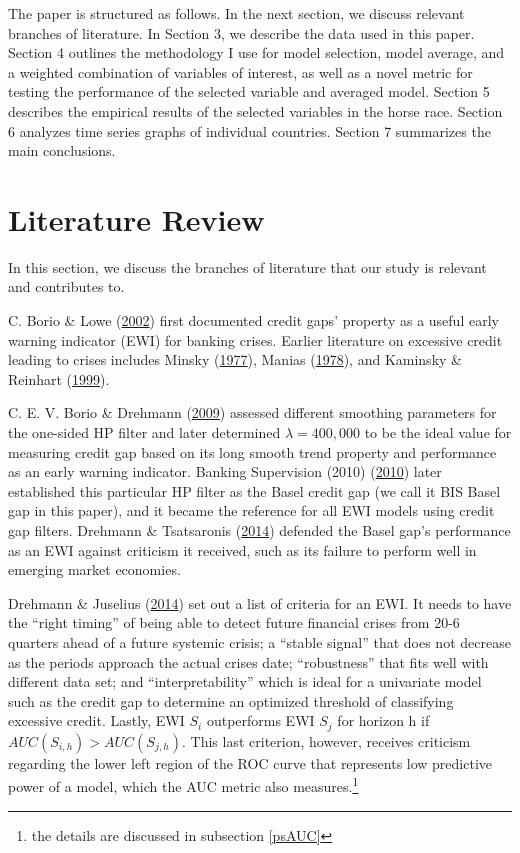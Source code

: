 \documentclass[
  12pt,
]{article}
\begin{document}
The paper is structured as follows. In the next section, we discuss relevant branches of literature. In Section 3, we describe the data used in this paper. Section 4 outlines the methodology I use for model selection, model average, and a weighted combination of variables of interest, as well as a novel metric for testing the performance of the selected variable and averaged model. Section 5 describes the empirical results of the selected variables in the horse race. Section 6 analyzes time series graphs of individual countries. Section 7 summarizes the main conclusions.

\hypertarget{literature-review}{%
\section{Literature Review}\label{literature-review}}

In this section, we discuss the branches of literature that our study is relevant and contributes to.

C. Borio \& Lowe (\protect\hyperlink{ref-borio_assessing_2002}{2002}) first documented credit gaps' property as a useful early warning indicator (EWI) for banking crises. Earlier literature on excessive credit leading to crises includes Minsky (\protect\hyperlink{ref-minsky_financial_1977}{1977}), Manias (\protect\hyperlink{ref-manias_panics_1978}{1978}), and Kaminsky \& Reinhart (\protect\hyperlink{ref-kaminsky_twin_1999}{1999}).

C. E. V. Borio \& Drehmann (\protect\hyperlink{ref-borio_assessing_2009}{2009}) assessed different smoothing parameters for the one-sided HP filter and later determined \(\lambda=400,000\) to be the ideal value for measuring credit gap based on its long smooth trend property and performance as an early warning indicator. Banking Supervision (2010) (\protect\hyperlink{ref-basel_guidance_2010}{2010}) later established this particular HP filter as the Basel credit gap (we call it BIS Basel gap in this paper), and it became the reference for all EWI models using credit gap filters. Drehmann \& Tsatsaronis (\protect\hyperlink{ref-drehmann_credit_2014}{2014}) defended the Basel gap's performance as an EWI against criticism it received, such as its failure to perform well in emerging market economies.

Drehmann \& Juselius (\protect\hyperlink{ref-drehmann_evaluating_2014}{2014}) set out a list of criteria for an EWI. It needs to have the ``right timing'' of being able to detect future financial crises from 20-6 quarters ahead of a future systemic crisis; a ``stable signal'' that does not decrease as the periods approach the actual crises date; ``robustness'' that fits well with different data set; and ``interpretability'' which is ideal for a univariate model such as the credit gap to determine an optimized threshold of classifying excessive credit. Lastly, EWI \(S_i\) outperforms EWI \(S_j\) for horizon h if \(AUC(S_{i,h}) > AUC(S_{j,h})\). This last criterion, however, receives criticism regarding the lower left region of the ROC curve that represents low predictive power of a model, which the AUC metric also measures.\footnote{the details are discussed in subsection \ref{psAUC}}
\end{document}
